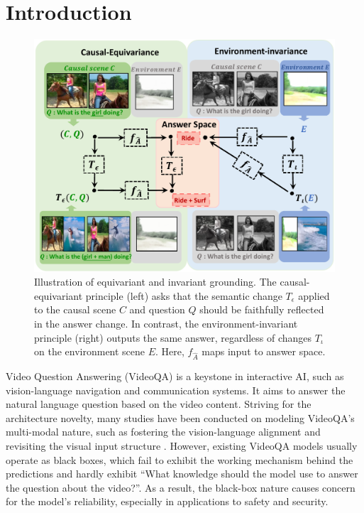 \section{Introduction}
\label{sec:introduction}

\begin{figure}[t]
\centering
\includegraphics[scale=0.47]{fig/f1.pdf}
\vspace{-15pt}
\caption{
Illustration of equivariant and invariant grounding.
The causal-equivariant principle (left) asks that the semantic change $T_{\epsilon}$ applied to the causal scene $C$ and question $Q$ should be faithfully reflected in the answer change.
In contrast, the environment-invariant principle (right) outputs the same answer, regardless of changes $T_{\iota}$ on the environment scene $E$.
Here, $f_{\hat{A}}$ maps input to answer space.
}
\vspace{-15pt}
\label{fig:overview}
\end{figure}

Video Question Answering (VideoQA) \cite{zhong2022video} is a keystone in interactive AI, such as vision-language navigation and communication systems.
It aims to answer the natural language question based on the video content.
Striving for the architecture novelty, many studies have been conducted on modeling VideoQA's multi-modal nature, such as fostering the vision-language alignment \cite{jiang2020reasoning,park2021bridge} and revisiting the visual input structure \cite{le2021hierarchical,dang2021hierarchical}.
However, existing VideoQA models usually operate as black boxes, which fail to exhibit the working mechanism behind the predictions and hardly exhibit ``What knowledge should the model use to answer the question about the video?''.
As a result, the black-box nature causes concern for the model's reliability, especially in applications to safety and security.



